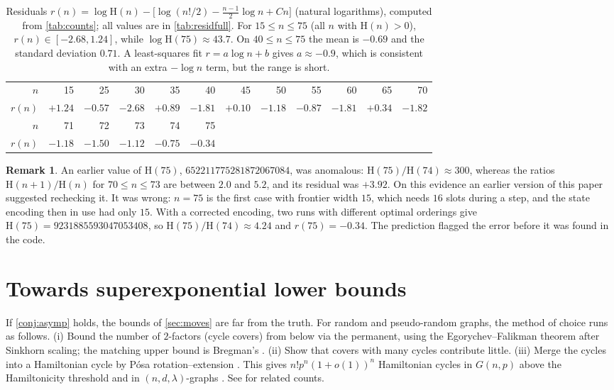 \documentclass[11pt]{amsart}
\theoremstyle{definition}
\newtheorem{remark}[theorem]{Remark}
\newcommand{\Ham}{\mathrm{H}}
\begin{document}
\begin{table}[h]
\centering\small
\begin{tabular}{rrrrrrrrrrrr}
\toprule
$n$ & 15 & 25 & 30 & 35 & 40 & 45 & 50 & 55 & 60 & 65 & 70\\
$r(n)$ & $+1.24$ & $-0.57$ & $-2.68$ & $+0.89$ & $-1.81$ & $+0.10$ & $-1.18$ & $-0.87$ & $-1.81$ & $+0.34$ & $-1.82$\\
\midrule
$n$ & 71 & 72 & 73 & 74 & 75\\
$r(n)$ & $-1.18$ & $-1.50$ & $-1.12$ & $-0.75$ & $-0.34$\\
\bottomrule
\end{tabular}
\caption{Residuals $r(n)=\log\Ham(n)-\bigl[\log(n!/2)-\frac{n-1}2\log n+Cn\bigr]$
(natural logarithms), computed from \cref{tab:counts}; all values are in \cref{tab:residfull}. For $15\le n\le75$ (all $n$
with $\Ham(n)>0$), $r(n)\in[-2.68,1.24]$, while $\log\Ham(75)\approx43.7$. On
$40\le n\le75$ the mean is $-0.69$ and the standard deviation $0.71$. A least-squares
fit $r=a\log n+b$ gives $a\approx-0.9$, which is consistent with an extra $-\log n$
term, but the range is short.}
\label{tab:resid}
\end{table}

\begin{remark}
An earlier value of $\Ham(75)$, $652211775281872067084$, was anomalous:
$\Ham(75)/\Ham(74)\approx300$, whereas the ratios $\Ham(n+1)/\Ham(n)$ for $70\le n\le73$
are between $2.0$ and $5.2$, and its residual was $+3.92$. On this evidence an earlier
version of this paper suggested rechecking it. It was wrong: $n=75$ is the first case
with frontier width $15$, which needs $16$ slots during a step, and the state encoding
then in use had only $15$. With a corrected encoding, two runs with different optimal
orderings give $\Ham(75)=9231885593047053408$, so $\Ham(75)/\Ham(74)\approx4.24$ and
$r(75)=-0.34$. The prediction flagged the error before it was found in the code.
\end{remark}

\section{Towards superexponential lower bounds}\label{sec:superexp}

If \cref{conj:asymp} holds, the bounds of \cref{sec:moves} are far from the truth.
For random and pseudo-random graphs, the method of choice runs as follows.
(i) Bound the number of $2$-factors (cycle covers) from below via the permanent, using
the Egorychev--Falikman theorem \cite{Egorychev,Falikman} after Sinkhorn scaling; the
matching upper bound is Bregman's \cite{Bregman}. (ii) Show that covers with many
cycles contribute little. (iii) Merge the cycles into a Hamiltonian cycle by
P\'osa rotation--extension \cite{Posa}. This gives $n!p^n(1+o(1))^n$ Hamiltonian cycles in
$G(n,p)$ above the Hamiltonicity threshold \cite{GlebovKrivelevich} and in
$(n,d,\lambda)$-graphs \cite{Krivelevich}. See \cite{CooperFrieze,CucklerKahn,FKS} for
related counts.
\end{document}
